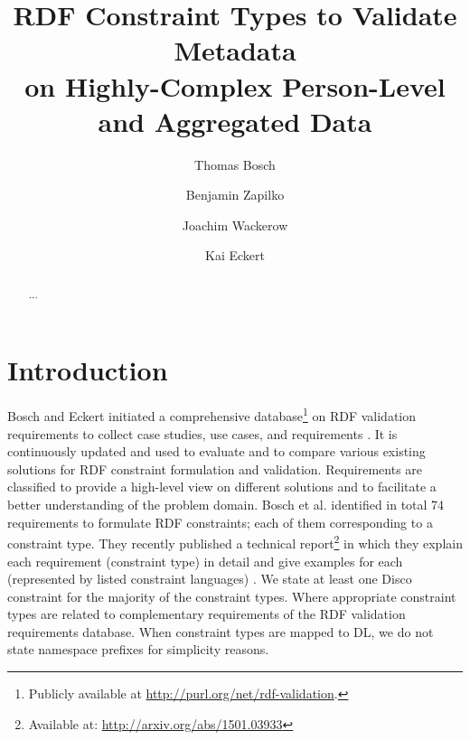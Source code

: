 \documentclass{llncs}
\begin{document}
\renewcommand{\arraystretch}{1.3}
%
%
\title{RDF Constraint Types to Validate Metadata \\ on Highly-Complex Person-Level and Aggregated Data}
\subtitle{}

%
\author{Thomas Bosch \and Benjamin Zapilko \and Joachim Wackerow \and Kai Eckert}
%
\authorrunning{} %
%

\maketitle              %

\begin{abstract}
...


\end{abstract}

\section{Introduction}

Bosch and Eckert initiated a comprehensive database\footnote{Publicly available at \url{http://purl.org/net/rdf-validation}.} on RDF validation requirements to collect case studies, use cases, and requirements \cite{BoschEckert2014}. 
It is continuously updated and used to evaluate and to compare various existing solutions for RDF constraint formulation and validation. 
Requirements are classified to provide a high-level view on different solutions and to facilitate a better understanding of the problem domain.
Bosch et al. identified in total 74 requirements to formulate RDF constraints; each of them corresponding to a constraint type. 
They recently published a technical report\footnote{Available at: \url{http://arxiv.org/abs/1501.03933}} in which they explain each requirement (constraint type) in detail and give examples for each (represented by listed constraint languages) \cite{BoschNolleAcarEckert2015}.
We state at least one Disco constraint for the majority of the constraint types.
Where appropriate constraint types are related to complementary requirements of the RDF validation requirements database.
When constraint types are mapped to DL, we do not state namespace prefixes for simplicity reasons.
\end{document}

